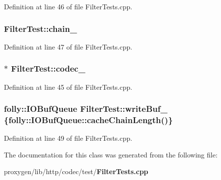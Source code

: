 Definition at line 46 of file Filter\+Tests.\+cpp.

\subsubsection[{chain\+\_\+}]{ Filter\+Test\+::chain\+\_\+\hspace{0.3cm}{\ttfamily [protected]}}\label{classFilterTest_a70d4af1f97ebb29d973ed426f3cc41a5}


Definition at line 47 of file Filter\+Tests.\+cpp.

\subsubsection[{codec\+\_\+}]{$\ast$ Filter\+Test\+::codec\+\_\+\hspace{0.3cm}{\ttfamily [protected]}}\label{classFilterTest_ad9960b56021e3e1b9a4ba9b47e2e9892}


Definition at line 45 of file Filter\+Tests.\+cpp.

\subsubsection[{write\+Buf\+\_\+}]{\setlength{\rightskip}{0pt plus 5cm}folly\+::\+I\+O\+Buf\+Queue Filter\+Test\+::write\+Buf\+\_\+ \{folly\+::\+I\+O\+Buf\+Queue\+::cache\+Chain\+Length()\}\hspace{0.3cm}{\ttfamily [protected]}}\label{classFilterTest_a0cec15af83736d93b649990e77cee11c}


Definition at line 49 of file Filter\+Tests.\+cpp.



The documentation for this class was generated from the following file\+:\begin{DoxyCompactItemize}
\item 
proxygen/lib/http/codec/test/{\bf Filter\+Tests.\+cpp}\end{DoxyCompactItemize}
